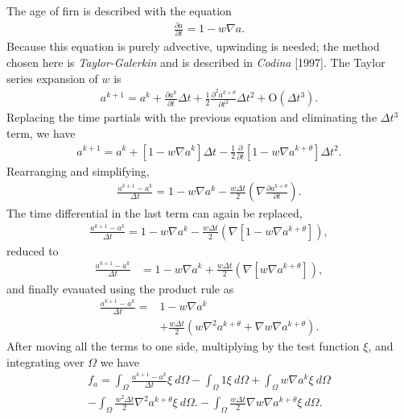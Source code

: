 \documentclass{article}%
\begin{document}
The age of firn is described with the equation
\begin{align}
  \frac{\partial a}{\partial t} = 1 - w \nabla{a}.
\end{align}
Because this equation is purely advective, upwinding is needed; the method chosen here is \emph{Taylor-Galerkin} and is described in \emph{Codina} [1997].  The Taylor series expansion of $w$ is
\begin{align*}
  a^{k+1} = a^{k} + \frac{\partial a^k}{\partial t}\Delta t + 
            \frac{1}{2}\frac{\partial^2 a^{k+\theta}}{\partial t^2}\Delta t^2 + 
            \mathrm{O} (\Delta t^3).
\end{align*}
Replacing the time partials with the previous equation and eliminating the $\Delta t^3$ term, we have
\begin{align*}
  a^{k+1} = a^{k} + \left[1 - w \nabla{a}^k \right] \Delta t
            - \frac{1}{2}\frac{\partial}{\partial t}
              \left[1 - w \nabla{a}^{k+\theta} \right] \Delta t^2. 
\end{align*}
Rearranging and simplifying,
\begin{align*}
  \frac{a^{k+1} - a^{k}}{\Delta t} = 1 - w \nabla{a}^k
        - \frac{w \Delta t}{2} 
          \left( \nabla \frac{\partial a^{k+\theta}}{\partial t} \right).
\end{align*}
The time differential in the last term can again be replaced, 
\begin{align*}
  \frac{a^{k+1} - a^{k}}{\Delta t} = 1 - w \nabla{a}^k
        - \frac{w \Delta t}{2} 
          \left( \nabla [1 - w \nabla a^{k+\theta}] \right),
\end{align*}
reduced to
\begin{align*}
  \frac{a^{k+1} - a^{k}}{\Delta t} &= 1 - w \nabla{a}^k
        + \frac{w \Delta t}{2} 
          \left( \nabla [w \nabla a^{k+\theta}] \right),
\end{align*}
and finally evauated using the product rule as
\begin{align*}
  \frac{a^{k+1} - a^{k}}{\Delta t} = &1 - w \nabla{a}^k\\
        &+ \frac{w \Delta t}{2} 
          \left( w \nabla^2 a^{k+\theta} + \nabla w \nabla a^{k+\theta} \right).
\end{align*}
After moving all the terms to one side, multiplying by the test function $\xi$, and integrating over $\Omega$ we have
\begin{align*}
  f_a = \int_{\Omega} \frac{a^{k+1} - a^{k}}{\Delta t}\xi\ d\Omega - 
      \int_{\Omega} 1\xi\ d\Omega
  + \int_{\Omega} w \nabla{a}^k \xi\ d\Omega \\
  - \int_{\Omega} \frac{w^2 \Delta t}{2} 
    \nabla^2 a^{k+\theta} \xi\ d\Omega.
  - \int_{\Omega} \frac{w \Delta t}{2} 
    \nabla w \nabla a^{k+\theta} \xi\ d\Omega.
\end{align*}
\end{document}
